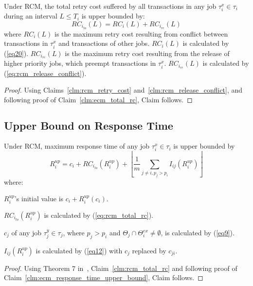 %
\begin{clm}\label{clm:rcm_total_rc}
Under RCM, the total retry cost suffered by all transactions in any job $\tau_i^x \in \tau_i$ during an interval $L\le T_i$ is upper bounded by:
\begin{equation}
RC_{i_{to}}(L)=RC_i(L)+RC_{i_{re}}(L)
\label{eq:rcm_total_rc}
\end{equation}
where $RC_i(L)$ is the maximum retry cost resulting from conflict between transactions in $\tau_i^x$ and transactions of other jobs. $RC_i(L)$ is calculated by (\ref{eq20}). $RC_{i_{re}}(L)$ is the maximum retry cost resulting from the release of higher priority jobs, which preempt transactions in $\tau_i^x$. $RC_{i_{re}}(L)$ is calculated by (\ref{eq:rcm_release_conflict}).
%
\end{clm}
\begin{proof}\normalfont
%
Using Claims~\ref{clm:rcm_retry_cost} and~\ref{clm:rcm_release_conflict}, and following proof of Claim~\ref{clm:ecm_total_rc}, Claim follows.
%
\end{proof}
%
\subsection{Upper Bound on Response Time}
%
\begin{clm}\label{clm:rcm_response_time_upper_bound}
%
Under RCM, maximum response time of any job $\tau_i^x \in \tau_i$ is upper bounded by 
%
\begin{equation}
R_{i}^{up}=c_{i}+RC_{i_{to}}(R_i^{up})+\left\lfloor\frac{1}{m}\sum_{j\ne i, p_j > p_i}I_{ij}(R_{i}^{up})\right\rfloor
\label{eq:rcm_response_time_upper_bound}
\end{equation}
%
where:
\begin{compactitem}
\item $R_{i}^{up}$'s initial value is $c_i + R_i^{up}(c_i)$.
\item $RC_{i_{to}}(R_i^{up})$ is calculated by (\ref{eq:rcm_total_rc}).
\item $c_j$ of any job $\tau_j^y \in \tau_j$, where $p_j > p_i$ and $\Theta_j \cap \Theta_i^{ex} \neq \emptyset$, is calculated by (\ref{eq9}).
\item $I_{ij}(R_{i}^{up})$ is calculated by (\ref{eq12}) with $c_{j}$ replaced by 
$c_{ji}$.
\end{compactitem}
%
\end{clm}
%
\begin{proof}
%
Using Theorem 7 in~\cite{key-2}, Claim~\ref{clm:rcm_total_rc} and following proof of Claim~\ref{clm:ecm_response_time_upper_bound}, Claim follows.
%
\end{proof}
%
